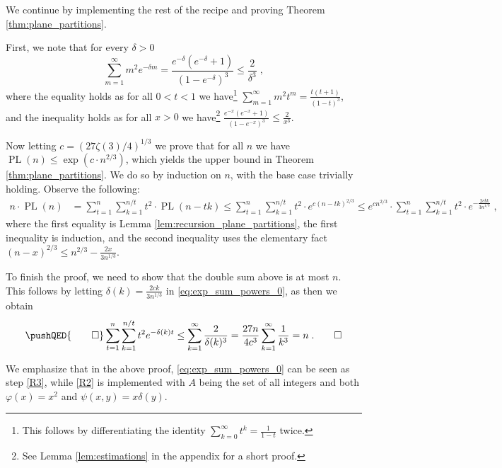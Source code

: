 \documentclass[11pt]{article}
\makeatletter
\DeclareMathOperator{\PL}{PL}
\theoremstyle{plain}
\renewenvironment{proof}[1][\proofname]
{\par\pushQED{\qed}
	\normalfont\topsep6\p@\@plus6\p@\relax\trivlist
	\item[\hskip\labelsep\bfseries#1\@addpunct{.}]
	\ignorespaces}
{\popQED\endtrivlist\@endpefalse}
\makeatother
\begin{document}
We continue by implementing the rest of the recipe and proving Theorem \ref{thm:plane_partitions}.


\begin{proof}[Proof of Theorem \ref{thm:plane_partitions}]
  First, we note that for every $\delta>0$
\begin{equation}\label{eq:exp_sum_powers_0}
    \sum_{m=1}^{\infty} m^2 e^{-\delta m} = \frac{e^{-\delta}(e^{-\delta}+1)}{(1-e^{-\delta})^3}\leq \frac{2}{\delta^3}\;,
\end{equation}
where the equality holds as for all $0<t<1$ we have\footnote{This follows by differentiating the identity $\sum_{k=0}^{\infty}t^{k}=\frac{1}{1-t}$ twice.}
$\sum_{m=1}^{\infty}m^2t^m=\frac{t(t+1)}{(1-t)^3}$, and the inequality holds as for all $x>0$ we have\footnote{See Lemma \ref{lem:estimations} in the appendix for a short proof.} $\frac{e^{-x}(e^{-x}+1)}{(1-e^{-x})^3}\leq \frac{2}{x^3}$.

Now letting $c= (27\zeta(3)/4)^{1/3}$ we prove that for all $n$ we have $\PL(n)\leq\exp(c\cdot n^{2/3})$, which yields the upper bound in Theorem \ref{thm:plane_partitions}. We do so by induction on $n$, with the base case trivially holding. Observe the following:
\begin{align*}
    n\cdot \PL(n) &= \sum _{t=1}^{n} \sum_{k=1}^{n/t} t^2 \cdot \PL(n-tk)\leq \sum _{t=1}^{n} \sum_{k=1}^{n/t} t^2\cdot e^{c(n-tk)^{2/3}} \leq e^{cn^{2/3}}\cdot \sum_{t=1}^{n} \sum _{k=1}^ {n/t} t^2 \cdot e^{-\frac{2ctk}{3n^{1/3}}}\;,
\end{align*}
where the first equality is Lemma \ref{lem:recursion_plane_partitions}, the first inequality is induction, and the second inequality uses the elementary fact
$(n-x)^{2/3}\leq n^{2/3}-\frac{2x}{3n^{1/3}}$.

To finish the proof, we need to show that the double sum above is at most $n$.
This follows by letting $\delta(k)=\frac{2ck}{3n^{1/3}}$ in \eqref{eq:exp_sum_powers_0}, as then we obtain
\begin{equation*}
\pushQED{\qed}
    \sum_{t=1}^{n}\sum_{k=1}^{n/t} t^2 e^{-\delta(k) t} \leq \sum_{k=1}^{\infty}\frac{2}{\delta(k)^3}=\frac{27n}{4c^3}\sum_{k=1}^{\infty}\frac{1}{k^{3}}=n\;.\qedhere
\end{equation*}
\end{proof}

We emphasize that in the above proof, \eqref{eq:exp_sum_powers_0} can be seen as step \ref{R3}, while \ref{R2} is implemented with $A$ being the set of all integers and both $\varphi(x)=x^2$ and $\psi(x,y)=x\delta(y)$.
\end{document}

